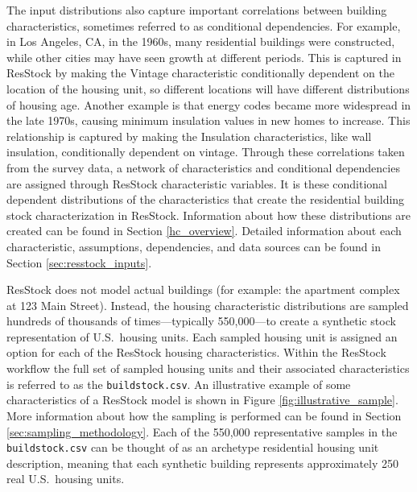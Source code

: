
The input distributions also capture important correlations between building characteristics, sometimes referred to as conditional dependencies. For example, in Los Angeles, CA, in the 1960s, many residential buildings were constructed, while other cities may have seen growth at different periods. This is captured in ResStock by making the Vintage characteristic conditionally dependent on the location of the housing unit, so different locations will have different distributions of housing age. Another example is that energy codes became more widespread in the late 1970s, causing minimum insulation values in new homes to increase. This relationship is captured by making the Insulation characteristics, like wall insulation, conditionally dependent on vintage. Through these correlations taken from the survey data, a network of characteristics and conditional dependencies are assigned through ResStock characteristic variables. It is these conditional dependent distributions of the characteristics that create the residential building stock characterization in ResStock. Information about how these distributions are created can be found in Section \ref{hc_overview}. Detailed information about each characteristic, assumptions, dependencies, and data sources can be found in Section \ref{sec:resstock_inputs}.

ResStock does not model actual buildings (for example: the apartment complex at 123 Main Street). Instead, the housing characteristic distributions are sampled hundreds of thousands of times---typically 550,000---to create a synthetic stock representation of U.S.~housing units. Each sampled housing unit is assigned an option for each of the ResStock housing characteristics. Within the ResStock workflow the full set of sampled housing units and their associated characteristics is referred to as the \texttt{buildstock.csv}. An illustrative example of some characteristics of a ResStock model is shown in Figure \ref{fig:illustrative_sample}. More information about how the sampling is performed can be found in Section \ref{sec:sampling_methodology}. Each of the 550,000 representative samples in the \texttt{buildstock.csv} can be thought of as an archetype residential housing unit description, meaning that each synthetic building represents approximately 250 real U.S.~housing units.

